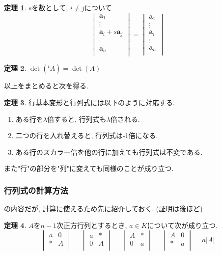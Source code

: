 \documentclass[dvipdfmx,a4paper,11pt]{article} %
\theoremstyle{definition}
\newtheorem{thm}{定理}
\begin{document}
\begin{thm}\cite[定理 3.2.4]{O}
$s$を数として, $i \neq j$について
$$
\begin{vmatrix}
\bm{a}_1 \\
\vdots \\
\bm{a}_i + s\bm{a}_j\\
\vdots \\
\bm{a}_n\\
\end{vmatrix}
=
\begin{vmatrix}
\bm{a}_1 \\
\vdots \\
\bm{a}_i \\
\vdots \\
\bm{a}_n\\
\end{vmatrix}
$$
\end{thm}

\begin{thm}\cite[定理 3.2.8]{O}
$\det({}^t A)  = \det (A)$
\end{thm}

以上をまとめると次を得る. 
\begin{thm}\cite[定理 3.2.5, 3.2.9]{O}
行基本変形と行列式には以下のように対応する. 
   \begin{enumerate}
 \item  ある行を$\lambda$倍すると, 行列式も$\lambda$倍される.
 \item 二つの行を入れ替えると, 行列式は-1倍になる. 
 \item ある行のスカラー倍を他の行に加えても行列式は不変である. 
 \end{enumerate}
 また"行"の部分を"列"に変えても同様のことが成り立つ. 
  \end{thm}
  
  
  \subsubsection{行列式の計算方法}
  
 \cite[3.3節]{O}の内容だが, 計算に使えるため先に紹介しておく. 
 (証明は後ほど)
  \begin{thm}\cite[定理 3.3.2]{O}
  $A$を$n-1$次正方行列とするとき, $a \in K$について次が成り立つ.
  $$
  \begin{vmatrix}
a & 0\\
\ast &   A\\
\end{vmatrix}
=
  \begin{vmatrix}
a & \ast \\
0 &   A\\
\end{vmatrix}
=
  \begin{vmatrix}
A & \ast \\
0 &   a\\
\end{vmatrix}
=
  \begin{vmatrix}
A & 0 \\
\ast &   a\\
\end{vmatrix}
=a |A|
$$
  \end{thm}
\end{document}
